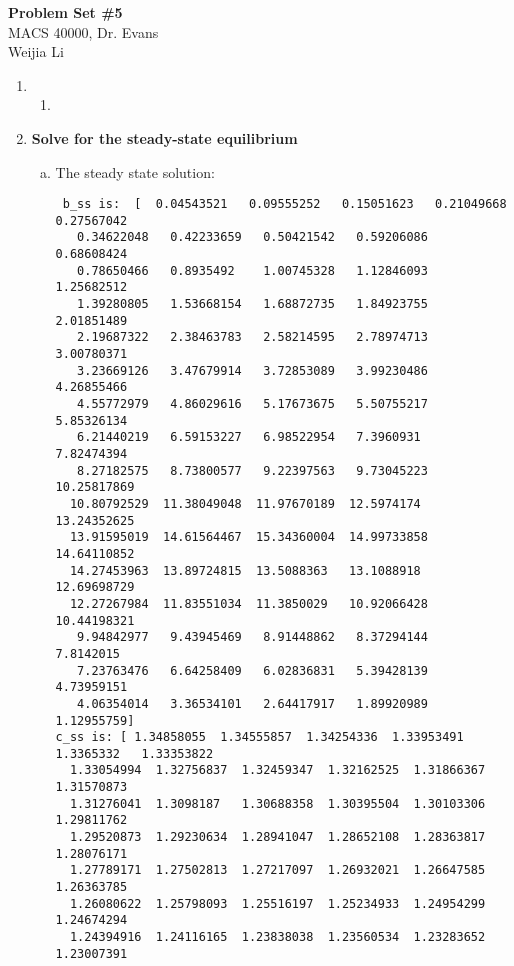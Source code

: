 \documentclass[letterpaper,12pt]{article}
\theoremstyle{definition}
\begin{document}
\begin{flushleft}
   \textbf{\large{Problem Set \#5}} \\
   MACS 40000, Dr. Evans \\
   Weijia Li
\end{flushleft}

\vspace{5mm}

\noindent\begin{enumerate}
   \item 
 	\begin{enumerate}
 	\item 
 	\end{enumerate}
 	
 	\item \textbf{Solve for the steady-state equilibrium}
 	\begin{enumerate}[(a)]
 	\item The steady state solution:
 	\begin{verbatim}
 b_ss is:  [  0.04543521   0.09555252   0.15051623   0.21049668   0.27567042
   0.34622048   0.42233659   0.50421542   0.59206086   0.68608424
   0.78650466   0.8935492    1.00745328   1.12846093   1.25682512
   1.39280805   1.53668154   1.68872735   1.84923755   2.01851489
   2.19687322   2.38463783   2.58214595   2.78974713   3.00780371
   3.23669126   3.47679914   3.72853089   3.99230486   4.26855466
   4.55772979   4.86029616   5.17673675   5.50755217   5.85326134
   6.21440219   6.59153227   6.98522954   7.3960931    7.82474394
   8.27182575   8.73800577   9.22397563   9.73045223  10.25817869
  10.80792529  11.38049048  11.97670189  12.5974174   13.24352625
  13.91595019  14.61564467  15.34360004  14.99733858  14.64110852
  14.27453963  13.89724815  13.5088363   13.1088918   12.69698729
  12.27267984  11.83551034  11.3850029   10.92066428  10.44198321
   9.94842977   9.43945469   8.91448862   8.37294144   7.8142015
   7.23763476   6.64258409   6.02836831   5.39428139   4.73959151
   4.06354014   3.36534101   2.64417917   1.89920989   1.12955759]
c_ss is: [ 1.34858055  1.34555857  1.34254336  1.33953491  1.3365332   1.33353822
  1.33054994  1.32756837  1.32459347  1.32162525  1.31866367  1.31570873
  1.31276041  1.3098187   1.30688358  1.30395504  1.30103306  1.29811762
  1.29520873  1.29230634  1.28941047  1.28652108  1.28363817  1.28076171
  1.27789171  1.27502813  1.27217097  1.26932021  1.26647585  1.26363785
  1.26080622  1.25798093  1.25516197  1.25234933  1.24954299  1.24674294
  1.24394916  1.24116165  1.23838038  1.23560534  1.23283652  1.23007391

\end{verbatim}
\end{enumerate}
\end{enumerate}
\end{document}
